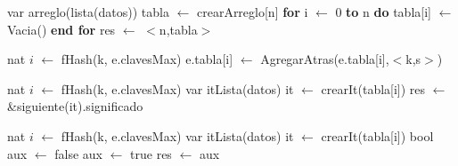 \disAlgoritmos
\begin{algorithm}[H]
\begin{algorithmic}[1]
 
	\State var arreglo(lista(datos)) tabla $\gets$ crearArreglo[n] 
	\State \textbf{for} i $\gets$ 0 \textbf{to} n \textbf{do} 
  	\State tabla[i] $\gets$ Vacia() 
  	\State \textbf{end for}
  	\State res $\gets$ $<$n,tabla$>$ 
\EndFunction
\end{algorithmic}
\end{algorithm}

\begin{algorithm}[H]
\begin{algorithmic}[1]
 
    \State nat $i$ $\gets$ fHash(k, e.clavesMax) 
    \State e.tabla[i] $\gets$ AgregarAtras(e.tabla[i],$<$k,s$>$) 
\EndFunction
\end{algorithmic}
\end{algorithm}

\begin{algorithm}[H]
\begin{algorithmic}[1]
 
  \State nat $i$ $\gets$ fHash(k, e.clavesMax) 
  \State var itLista(datos) it $\gets$ crearIt(tabla[i])
    \State res $\gets$ &siguiente(it).significado
  \EndIf
  \EndWhile
\EndFunction
\end{algorithmic}
\end{algorithm}



\begin{algorithm}[H]
\begin{algorithmic}[1]
 
  \State nat $i$ $\gets$ fHash(k, e.clavesMax) 
  \State var itLista(datos) it $\gets$ crearIt(tabla[i])
  \State bool aux $\gets$ false
    \State aux $\gets$ true
  \EndIf
  \EndWhile
  \State res $\gets$ aux
\EndFunction
\end{algorithmic}
\end{algorithm}

